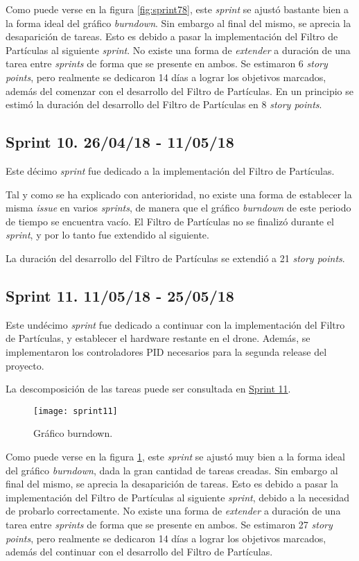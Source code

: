 Como puede verse en la figura \ref{fig:sprint78}, este \emph{sprint} se ajustó bastante bien a la forma ideal del gráfico \emph{burndown}. Sin embargo al final del mismo, se aprecia la desaparición de tareas. Esto es debido a pasar la implementación del Filtro de Partículas al siguiente \emph{sprint}. No existe una forma de \emph{extender} a duración de una tarea entre \emph{sprints} de forma que se presente en ambos.
Se estimaron 6 \emph{story points}, pero realmente se dedicaron 14 días a lograr los objetivos marcados, además del comenzar con el desarrollo del Filtro de Partículas.
En un principio se estimó la duración del desarrollo del Filtro de Partículas en 8 \emph{story points}.

\subsection{Sprint 10. 26/04/18 - 11/05/18}

Este décimo \emph{sprint} fue dedicado a la implementación del Filtro de Partículas.

Tal y como se ha explicado con anterioridad, no existe una forma de establecer la misma \emph{issue} en varios \emph{sprints}, de manera que el gráfico \emph{burndown} de este periodo de tiempo se encuentra vacío. El Filtro de Partículas no se finalizó durante el \emph{sprint}, y por lo tanto fue extendido al siguiente.

La duración del desarrollo del Filtro de Partículas se extendió a 21 \emph{story points}.


\subsection{Sprint 11. 11/05/18 - 25/05/18}

Este undécimo \emph{sprint} fue dedicado a continuar con la implementación del Filtro de Partículas, y establecer el hardware restante en el drone.
Además, se implementaron los controladores PID necesarios para la segunda release del proyecto.

La descomposición de las tareas puede ser consultada en \href{https://github.com/mbm0089/gii_0_17.02_snsi/milestone/10?closed=1}{Sprint 11}.

\begin{figure}[H]
	\centering
	\texttt{[image: sprint11]}
	\caption[Burndown Sprint 11]{Gráfico burndown.}\label{fig:sprint11}
\end{figure}

Como puede verse en la figura \ref{fig:sprint11}, este \emph{sprint} se ajustó muy bien a la forma ideal del gráfico \emph{burndown}, dada la gran cantidad de tareas creadas. Sin embargo al final del mismo, se aprecia la desaparición de tareas. Esto es debido a pasar la implementación del Filtro de Partículas al siguiente \emph{sprint}, debido a la necesidad de probarlo correctamente. No existe una forma de \emph{extender} a duración de una tarea entre \emph{sprints} de forma que se presente en ambos.
Se estimaron 27 \emph{story points}, pero realmente se dedicaron 14 días a lograr los objetivos marcados, además del continuar con el desarrollo del Filtro de Partículas.

